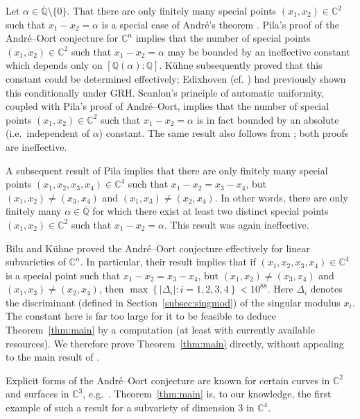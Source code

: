 \documentclass[12pt,a4paper,oneside]{amsart}
\begin{document}
	Let $\alpha \in \overline{\mathbb{Q}} \setminus \{0\}$. That there are only finitely many special points $(x_1, x_2) \in \mathbb{C}^2$ such that $x_1 - x_2 = \alpha$ is a special case of Andr\'e's theorem \cite{Andre98}.	Pila's proof \cite[Th.~13.2]{Pila11} of the Andr\'e--Oort conjecture for $\mathbb{C}^n$ implies that the number of special points $(x_1, x_2) \in \mathbb{C}^2$ such that $x_1 - x_2 = \alpha$ may be bounded by an ineffective constant which depends only on $[\mathbb{Q}(\alpha) : \mathbb{Q}]$. K\"uhne \cite[Th.~4]{Kuhne13} subsequently proved that this constant could be determined effectively; Edixhoven \cite[Remark~7.1]{Edixhoven98} (cf. \cite[Th.~3.1]{Breuer01}) had previously shown this conditionally under GRH. Scanlon's principle of automatic uniformity, coupled with Pila's proof of Andr\'e--Oort, implies \cite[Th.~4.2]{Scanlon04} that the number of special points $(x_1, x_2) \in \mathbb{C}^2$ such that $x_1 - x_2 = \alpha$ is in fact bounded by an absolute (i.e.~independent of $\alpha$) constant. The same result also follows from \cite[Th.~1.1]{BiluLucaMasser17}; both proofs are ineffective.
	
	A subsequent result of Pila \cite[Th.~1.3]{Pila14a} implies that there are only finitely many special points $(x_1, x_2, x_3, x_4) \in \mathbb{C}^4$ such that $x_1 - x_2 = x_3 - x_4$, but $(x_1, x_2) \neq (x_3, x_4)$ and $(x_1, x_3) \neq (x_2, x_4)$. In other words, there are only finitely many $\alpha \in \overline{\mathbb{Q}}$ for which there exist at least two distinct special points $(x_1, x_2) \in \mathbb{C}^2$ such that $x_1 - x_2 = \alpha$. This result was again ineffective.
	
	Bilu and K\"uhne \cite{BiluKuhne20} proved the Andr\'e--Oort conjecture effectively for linear subvarieties of $\mathbb{C}^n$. In particular, their result \cite[Th.~1.1]{BiluKuhne20} implies that if $(x_1, x_2, x_3, x_4) \in \mathbb{C}^4$ is a special point such that $x_1 - x_2 = x_3 - x_4$, but $(x_1, x_2) \neq (x_3, x_4)$ and $(x_1, x_3) \neq (x_2, x_4)$, then $ \max \left\{ \left\lvert \Delta_i \right\rvert : i=1, 2, 3, 4 \right\} <  10^{88}$. Here $\Delta_i$ denotes the discriminant (defined in Section~\ref{subsec:singmod}) of the singular modulus $x_i$. The constant here is far too large for it to be feasible to deduce Theorem~\ref{thm:main} by a computation (at least with currently available resources). We therefore prove Theorem~\ref{thm:main} directly, without appealing to the main result of \cite{BiluKuhne20}. 
	
	Explicit forms of the Andr\'e--Oort conjecture are known for certain curves in $\mathbb{C}^2$ and surfaces in $\mathbb{C}^3$, e.g.~\cite{AllombertBiluMadariaga15, BiluGunTron22, Fowler23}. Theorem~\ref{thm:main} is, to our knowledge, the first example of such a result for a subvariety of dimension $3$ in $\mathbb{C}^4$.
	
\end{document}
